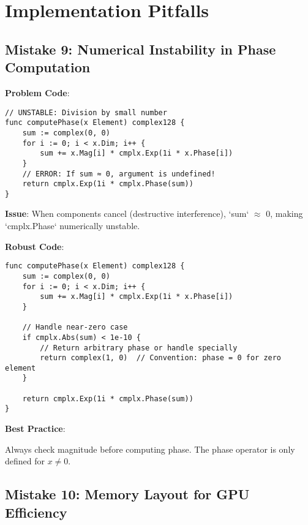\section{Implementation Pitfalls}

\subsection{Mistake 9: Numerical Instability in Phase Computation}

\begin{warning}
\textbf{Problem Code}:

\begin{lstlisting}[style=golang]
// UNSTABLE: Division by small number
func computePhase(x Element) complex128 {
    sum := complex(0, 0)
    for i := 0; i < x.Dim; i++ {
        sum += x.Mag[i] * cmplx.Exp(1i * x.Phase[i])
    }
    // ERROR: If sum ≈ 0, argument is undefined!
    return cmplx.Exp(1i * cmplx.Phase(sum))
}
\end{lstlisting}

\textbf{Issue}: When components cancel (destructive interference), `sum` $\approx$ 0, making `cmplx.Phase` numerically unstable.

\textbf{Robust Code}:

\begin{lstlisting}[style=golang]
func computePhase(x Element) complex128 {
    sum := complex(0, 0)
    for i := 0; i < x.Dim; i++ {
        sum += x.Mag[i] * cmplx.Exp(1i * x.Phase[i])
    }
    
    // Handle near-zero case
    if cmplx.Abs(sum) < 1e-10 {
        // Return arbitrary phase or handle specially
        return complex(1, 0)  // Convention: phase = 0 for zero element
    }
    
    return cmplx.Exp(1i * cmplx.Phase(sum))
}
\end{lstlisting}

\textbf{Best Practice}:

Always check magnitude before computing phase. The phase operator is only defined for $x \neq 0$.
\end{warning}

\subsection{Mistake 10: Memory Layout for GPU Efficiency}

